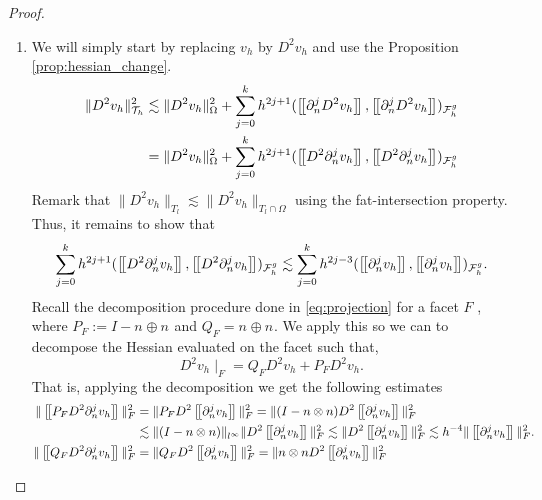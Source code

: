 \begin{proof}
\begin{enumerate}[label=\arabic*)]
    \item We will simply start by replacing $v_{h}$ by $D^2 v_{h}$ and use the Proposition \ref{prop:hessian_change}.
        \[
            \begin{split}
                    \| D^2 v_{h} \|_{ \mathcal{T} _{h} }^{2  }&  \lesssim \| D^2 v_{h} \|_{ \Omega  }^{ 2 }  + \sum_{j=0}^{k} h^{2j+1} ( \jump{   \partial ^{j}_{n} D^2 v_{h} }, \jump{  \partial ^{j}_{n} D^2 v_{h}}    )_{\mathcal{F}_{h}^{g}} \\
                    &=  \| D^2 v_{h} \|_{ \Omega  }^{ 2 }  + \sum_{j=0}^{k} h^{2j+1} ( \jump{   D^2 \partial ^{j}_{n}  v_{h} }, \jump{  D^2 \partial ^{j}_{n}  v_{h}}    )_{\mathcal{F}_{h}^{g}}
            \end{split}
        \]
        Remark that $\|  D^2 v_{h} \|_{ T_{l} }^{  } \lesssim  \|  D^2 v_{h} \|_{ T_{l} \cap \Omega  }^{  }  $ using the fat-intersection property.
        Thus, it remains to show that \[
        \sum_{j=0}^{k} h^{2j+1} ( \jump{   D^2 \partial ^{j}_{n}  v_{h} }, \jump{  D^2 \partial ^{j}_{n}  v_{h}}    )_{\mathcal{F}_{h}^{g}} \lesssim  \sum_{j=0}^{k} h^{2j-3} ( \jump{    \partial ^{j}_{n}  v_{h} }, \jump{  \partial ^{j}_{n}  v_{h}}
        )_{\mathcal{F}_{h}^{g}}.
        \]
        Recall the decomposition procedure done in \eqref{eq:projection} for a facet $F$ , where $P_{F} := I - n_{} \oplus n_{} $ and $Q_{F} = n_{} \oplus n_{}$. We apply this so we can to decompose the Hessian evaluated on the facet  such that, \[
        D^2 v_{h}  \mid _{F} = Q_{F}D^2v_{h} + P_{F} D^2 v_{h} .
        \]
        That is, applying the decomposition we get the following estimates \[
            \begin{split}
        \| \jump{ P_{F}   D^2 \partial _{n}^{j} v_{h} }\|_{ F }^{ 2 } & = \| P_{F} D^2 \jump{ \partial _{n}^{j} v_{h} }   \|_{ F  }^{ 2} = \| (I- n\otimes n) D^2 \jump{ \partial _{n}^{j} v_{h} }   \|_{ F  }^{ 2}    \\
        & \lesssim  \|  (I- n\otimes n) \|_{l^{\infty} }^{  } \| D^2 \jump{ \partial _{n}^{j} v_{h} }   \|_{ F  }^{ 2} \lesssim   \|  D^2 \jump{ \partial _{n}^{j} v_{h} }   \|_{ F  }^{ 2} \lesssim h^{-4} \|  \jump{ \partial ^{j}_{n} v_{h} }   \|_{ F }^{  2}. \\
        \| \jump{ Q_{F}   D^2 \partial _{n}^{j} v_{h} }\|_{ F }^{ 2 } & = \| Q_{F} D^2 \jump{ \partial _{n}^{j} v_{h} }   \|_{ F  }^{ 2} = \| n\otimes n D^2 \jump{ \partial _{n}^{j} v_{h} }   \|_{ F  }^{ 2}    \\

\end{split}\]
\end{enumerate}
\end{proof}
